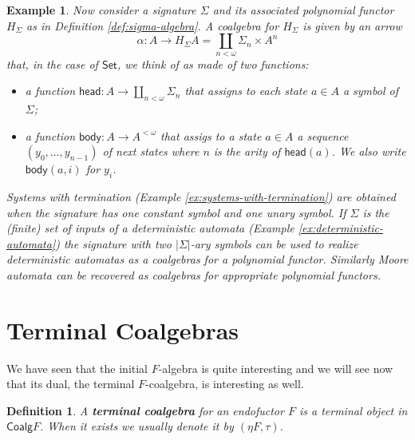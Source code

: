 \documentclass[letterpaper, 11pt, oneside]{memoir}
\theoremstyle{myteo}
\newtheorem{definition}[theorem]{Definition}
\newtheorem{example}[theorem]{Example}
\numberwithin{equation}{section}
\newcommand{\marginnote}[1]{\marginpar{\footnotesize #1}}
\newcommand{\head}{\textsf{head}}
\newcommand{\body}{\textsf{body}}
\newcommand{\Coalg}{\textsf{Coalg}}
\newcommand{\Set}{\textsf{Set}}
\newcommand{\CPO}{\textsf{CPO}}
\begin{document}
\begin{example}
  Now consider a signature \(\Sigma\) and its associated polynomial functor \(H_\Sigma\) as in Definition \ref{def:sigma-algebra}.
  A coalgebra for \(H_\Sigma\) is given by an arrow
  \begin{equation*}
    \alpha : A \to H_\Sigma A = \coprod_{n < \omega}\Sigma_n \times A^n
  \end{equation*}
  that, in the case of \(\Set\), we think of as made of two functions:
  \begin{itemize}
  \item a function \(\head : A \to \coprod_{n < \omega}\Sigma_n\) that assigns to each state \(a \in A\) a symbol of \(\Sigma\);
  \item a function \(\body : A \to A^{<\omega}\) that assigs to a state \(a \in A\) a sequence \((y_0, \ldots, y_{n-1})\) of next states where \(n\) is the arity of \(\head(a)\). We also write \(\body(a, i)\) for \(y_i\).
  \end{itemize}

  Systems with termination (Example \ref{ex:systems-with-termination}) are obtained when the signature has one constant symbol and one unary symbol.
  If \(\Sigma\) is the (finite) set of inputs of a deterministic automata (Example \ref{ex:deterministic-automata}) the signature with two \(|\Sigma|\)-ary symbols can be used to realize deterministic automatas as a coalgebras for a polynomial functor.
  Similarly Moore automata can be recovered as coalgebras for appropriate polynomial functors.
\end{example}


\section{Terminal Coalgebras}

We have seen that the initial \(F\)-algebra is quite interesting and we will see now that its dual, the terminal \(F\)-coalgebra, is interesting as well.

\begin{definition}
  A \textbf{terminal coalgebra}\marginnote{terminal coalgebra} for an endofuctor \(F\) is a terminal object in \(\Coalg F\).
  When it exists we usually denote it by \((\eta F, \tau)\).
\end{definition}
\end{document}
